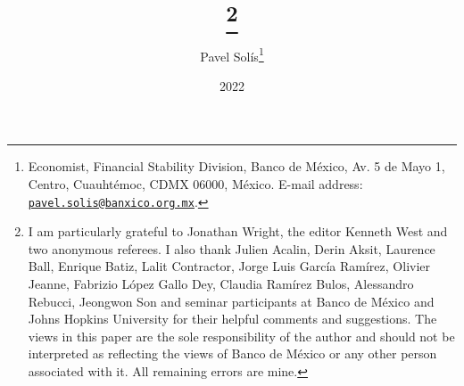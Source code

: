 \documentclass[a4paper,12pt]{article} 		%
\begin{document}
\title{\vspace{-1.0cm}\textchange{} \hspace{-1em} \thanks{\protect\linespread{1}\protect\selectfont I am particularly grateful to Jonathan Wright, the editor Kenneth West and two anonymous referees. I also thank Julien Acalin, Derin Aksit, Laurence Ball, Enrique Batiz, Lalit Contractor, Jorge Luis García Ramírez, Olivier Jeanne, Fabrizio López Gallo Dey, Claudia Ramírez Bulos, Alessandro Rebucci, Jeongwon Son and seminar participants at Banco de México and Johns Hopkins University for their helpful comments and suggestions. The views in this paper are the sole responsibility of the author and should not be interpreted as reflecting the views of Banco de México or any other person associated with it. All remaining errors are mine.} %
	}
\author{Pavel Solís\thanks{\protect\linespread{1}\protect\selectfont Economist, Financial Stability Division, Banco de México, Av. 5 de Mayo 1, Centro, Cuauhtémoc, CDMX 06000, México. E-mail address: \href{mailto:pavel.solis@banxico.org.mx}{\texttt{pavel.solis@banxico.org.mx}}.}
}
\date{2022}

\maketitle	\vspace{-4ex}





\newpage
\begin{appendices}
	
\end{appendices}

\titleformat{\section}{\large\bfseries}{}{0pt}{}
\uspunctuation
\printbibliography[title={LITERATURE CITED}]

\newpage
\theendnotes


\end{document}
